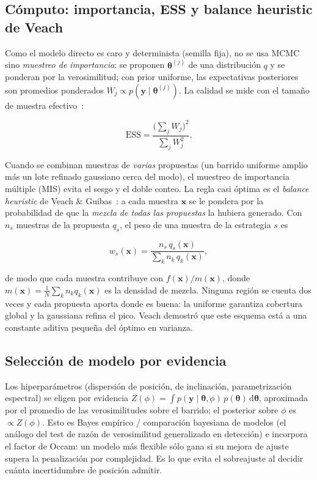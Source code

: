 \subsection{Cómputo: importancia, ESS y balance heuristic de Veach}\label{sec:mis}

Como el modelo directo es caro y determinista (semilla fija), no se usa MCMC sino
\emph{muestreo de importancia}: se proponen $\boldsymbol\theta^{(j)}$ de una
distribución $q$ y se ponderan por la verosimilitud; con prior uniforme, las
expectativas posteriores son promedios ponderados $W_j\propto
p(\mathbf{y}\mid\boldsymbol\theta^{(j)})$. La calidad se mide con el tamaño de
muestra efectivo~\cite{kong1994}:

\begin{equation}
\mathrm{ESS} = \frac{\bigl(\sum_j W_j\bigr)^2}{\sum_j W_j^2}.
\label{eq:ess}
\end{equation}

Cuando se combinan muestras de \emph{varias} propuestas (un barrido uniforme amplio
más un lote refinado gaussiano cerca del modo), el muestreo de importancia múltiple
(MIS) evita el sesgo y el doble conteo. La regla casi óptima es el \emph{balance
heuristic} de Veach \& Guibas~\cite{veach1995}: a cada muestra $\mathbf{x}$ se le
pondera por la probabilidad de que la \emph{mezcla de todas las propuestas} la
hubiera generado. Con $n_s$ muestras de la propuesta $q_s$, el peso de una muestra de
la estrategia $s$ es

\begin{equation}
w_s(\mathbf{x}) = \frac{n_s\,q_s(\mathbf{x})}{\sum_k n_k\,q_k(\mathbf{x})},
\label{eq:balance}
\end{equation}

de modo que cada muestra contribuye con $f(\mathbf{x})/m(\mathbf{x})$, donde
$m(\mathbf{x})=\tfrac1N\sum_k n_k q_k(\mathbf{x})$ es la densidad de mezcla. Ninguna
región se cuenta dos veces y cada propuesta aporta donde es buena: la uniforme
garantiza cobertura global y la gaussiana refina el pico. Veach demostró que este
esquema está a una constante aditiva pequeña del óptimo en varianza.

\subsection{Selección de modelo por evidencia}

Los hiperparámetros (dispersión de posición, de inclinación, parametrización
espectral) se eligen por evidencia $Z(\phi)=\int
p(\mathbf{y}\mid\boldsymbol\theta,\phi)\,p(\boldsymbol\theta)\,\mathrm{d}\boldsymbol\theta$,
aproximada por el promedio de las verosimilitudes sobre el barrido; el posterior
sobre $\phi$ es $\propto Z(\phi)$. Esto es Bayes empírico / comparación bayesiana de
modelos (el análogo del test de razón de verosimilitud generalizado en detección) e
incorpora el factor de Occam: un modelo más flexible sólo gana si su mejora de
ajuste supera la penalización por complejidad. Es lo que evita el sobreajuste al
decidir cuánta incertidumbre de posición admitir.

